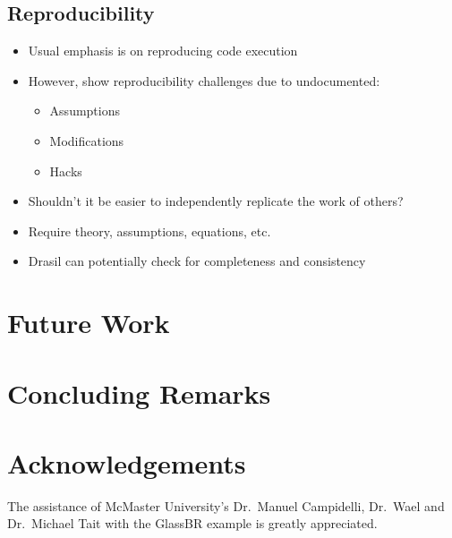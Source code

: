 \documentclass[sigconf]{acmart}
\begin{document}
\subsection{Reproducibility}

\begin{itemize}
\item Usual emphasis is on reproducing code execution
\item However, \cite{IonescuAndJansson2013} show reproducibility challenges due to
undocumented:
\begin{itemize}
\item Assumptions
\item Modifications
\item Hacks
\end{itemize}
\item Shouldn't it be easier to independently replicate the work of others?
\item Require theory, assumptions, equations, etc.
\item Drasil can potentially check for completeness and consistency
\end{itemize}

\section{Future Work} \label{SecFuture}

\section{Concluding Remarks}

\section{Acknowledgements}

The assistance of McMaster University's Dr.\ Manuel Campidelli, Dr.\ Wael and
Dr.\ Michael Tait with the GlassBR example is greatly appreciated.


 
\end{document}
